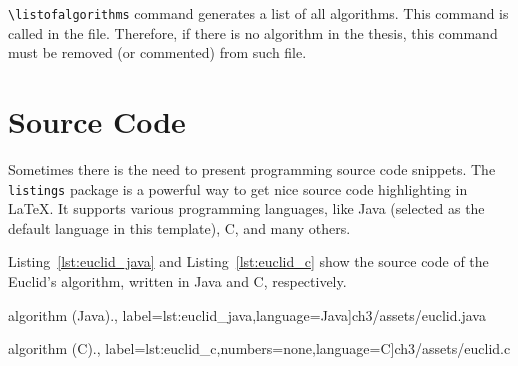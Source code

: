 \verb|\listofalgorithms| command generates a list of all algorithms. This command is called in the  file. Therefore, if there is no algorithm in the thesis, this command must be removed (or commented) from such file.

\section{Source Code}
Sometimes there is the need to present programming source code snippets.
The \verb|listings| package  is a powerful way to get nice source code highlighting in \LaTeX{}. It supports various programming languages, like Java (selected as the default language in this template), C, and many others.

Listing~\ref{lst:euclid_java} and Listing~\ref{lst:euclid_c} show the source code of the Euclid’s algorithm, written in Java and C, respectively.

\begin{minipage}{0.98\linewidth}
 algorithm (Java).,
label=lst:euclid_java,language=Java]{ch3/assets/euclid.java}
\end{minipage}

\begin{center}
\begin{minipage}{0.7\linewidth}
 algorithm (C).,
label=lst:euclid_c,numbers=none,language=C]{ch3/assets/euclid.c}
\end{minipage}
\end{center}

